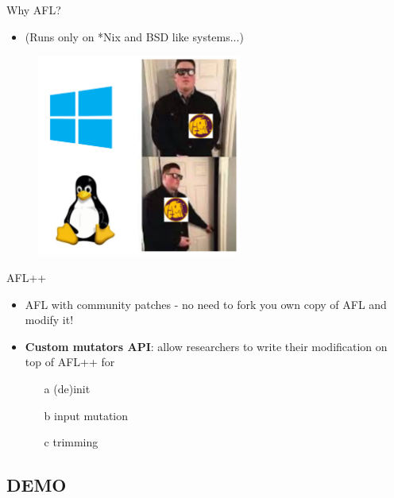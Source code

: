 \documentclass[xcolor=dvipsnames, 12pt]{beamer}
\begin{document}
\begin{frame}{Why AFL?}
        \begin{itemize}
                \item (Runs only on *Nix and BSD like systems...)
        \end{itemize}
        \begin{figure}
                \begin{center}
                        \includegraphics[width=0.6\textwidth]{assets/Afl_meme 3.png}
                \end{center}
        \end{figure}
\end{frame}

\begin{frame}{AFL++}
        \begin{itemize}
                \item AFL with community patches - no need to fork you own copy of AFL and modify it!
                \item \textbf{Custom mutators API}: allow researchers to write their modification on top of AFL++ for
                        \begin{enumerate}
                                \item[a] (de)init
                                \item[b] input mutation
                                \item[c] trimming
                        \end{enumerate}
        \end{itemize}
\end{frame}

\begin{NoHyper}
\begin{frame}
        \section{DEMO}
        \sectionpage
\end{frame}
\end{NoHyper}
\end{document}

